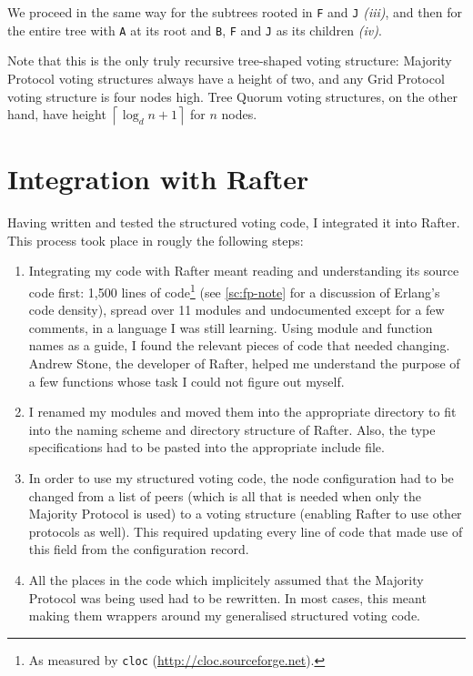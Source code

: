 \documentclass[12pt,chapterprefix=true,toc=bibliography,numbers=noendperiod,
               footnotes=multiple,twoside]{scrreprt}
\begin{document}
We proceed in the same way for the subtrees rooted in \texttt{F} and \texttt{J} \emph{(iii)}, and then for the entire tree with \texttt{A} at its root and \texttt{B}, \texttt{F} and \texttt{J} as its children \emph{(iv)}.

Note that this is the only truly recursive tree-shaped voting structure: Majority Protocol voting structures always have a height of two, and any Grid Protocol voting structure is four nodes high. Tree Quorum voting structures, on the other hand, have height \(\left \lceil \log_d{n+1} \right \rceil\) for \(n\) nodes.

\section{Integration with Rafter}
\label{sc:rafter-integration}

Having written and tested the structured voting code, I integrated it into Rafter. This process took place in rougly the following steps:

\begin{enumerate}
    \item Integrating my code with Rafter meant reading and understanding its source code first: 1,500 lines of code\footnote{As measured by \texttt{cloc} (\url{http://cloc.sourceforge.net}).} (see \cref{sc:fp-note} for a discussion of Erlang's code density), spread over 11 modules and undocumented except for a few comments, in a language I was still learning. Using module and function names as a guide, I found the relevant pieces of code that needed changing. Andrew Stone, the developer of Rafter, helped me understand the purpose of a few functions whose task I could not figure out myself.
    \item I renamed my modules and moved them into the appropriate directory to fit into the naming scheme and directory structure of Rafter. Also, the type specifications had to be pasted into the appropriate include file.
    \item In order to use my structured voting code, the node configuration had to be changed from a list of peers (which is all that is needed when only the Majority Protocol is used) to a voting structure (enabling Rafter to use other protocols as well). This required updating every line of code that made use of this field from the configuration record.
    \item All the places in the code which implicitely assumed that the Majority Protocol was being used had to be rewritten. In most cases, this meant making them wrappers around my generalised structured voting code.
\end{enumerate}
\end{document}
